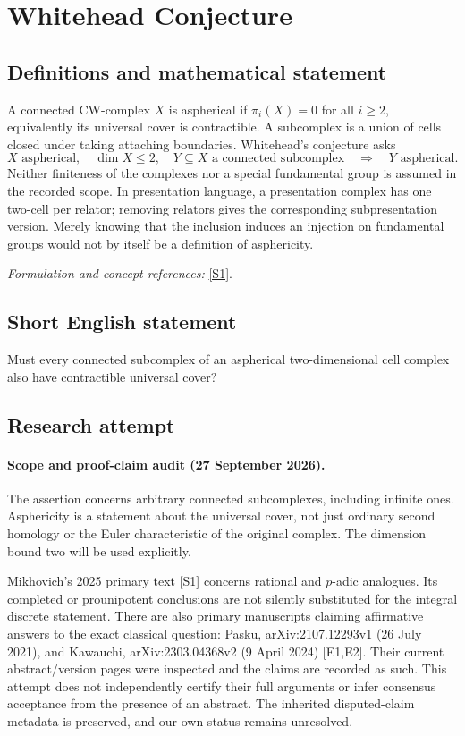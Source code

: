 \documentclass[11pt]{article}
\begin{document}
\section*{\texorpdfstring{Whitehead Conjecture}{Whitehead Conjecture}}\label{statement}
\subsection{Definitions and mathematical statement}
A connected CW-complex $X$ is aspherical if $\pi_i(X)=0$ for all $i\ge2$, equivalently its universal cover is contractible. A subcomplex is a union of cells closed under taking attaching boundaries. Whitehead's conjecture asks
\[
 X\text{ aspherical},\quad\dim X\le2,\quad
 Y\subseteq X\text{ a connected subcomplex}
 \quad\Longrightarrow\quad Y\text{ aspherical}.
\]
Neither finiteness of the complexes nor a special fundamental group is assumed in the recorded scope. In presentation language, a presentation complex has one two-cell per relator; removing relators gives the corresponding subpresentation version. Merely knowing that the inclusion induces an injection on fundamental groups would not by itself be a definition of asphericity.
\par\smallskip\textit{Formulation and concept references:} \href{https://www.mathnet.ru/php/archive.phtml?jrnid=im&option_lang=rus&paperid=9597&wshow=paper}{[S1]}.

\subsection{Short English statement}
Must every connected subcomplex of an aspherical two-dimensional cell complex also have contractible universal cover?
\subsection{Research attempt}
\paragraph{Scope and proof-claim audit (27 September 2026).}
The assertion concerns arbitrary connected subcomplexes, including
infinite ones. Asphericity is a statement about the universal cover,
not just ordinary second homology or the Euler characteristic of the
original complex. The dimension bound two will be used explicitly.

Mikhovich's 2025 primary text [S1] concerns rational and $p$-adic analogues.
Its completed or prounipotent conclusions are not silently substituted
for the integral discrete statement. There are also primary manuscripts
claiming affirmative answers to the exact classical question: Pasku,
arXiv:2107.12293v1 (26 July 2021), and Kawauchi,
arXiv:2303.04368v2 (9 April 2024) [E1,E2]. Their current abstract/version
pages were inspected and the claims are recorded as such. This attempt
does not independently certify their full arguments or infer consensus
acceptance from the presence of an abstract. The inherited disputed-claim
metadata is preserved, and our own status remains unresolved.
\end{document}
